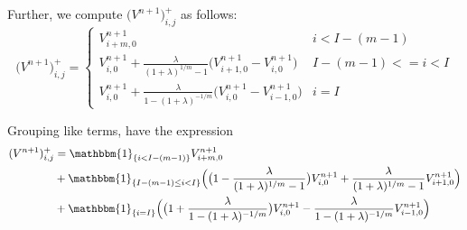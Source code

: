 \documentclass[12pt,english]{article}
\theoremstyle{remark}
\begin{document}
Further, we compute $\big(V^{n+1}\big)^+_{i,j}$ as follows: 
\[ \big(V^{n+1}\big)^+_{i,j} = \begin{cases} 
V^{n+1}_{i+m,0} & i < I - (m-1) \\
V^{n+1}_{i,0} + \frac{\lambda}{(1+\lambda)^{1/m} -1}\big( V^{n+1}_{i+1,0} - V^{n+1}_{i,0} \big) & I - (m-1) <= i < I \\
V^{n+1}_{i,0} + \frac{\lambda}{1-(1+\lambda)^{-1/m}}\big( V^{n+1}_{i,0} - V^{n+1}_{i-1,0} \big) & i = I 

\end{cases}
\]

Grouping like terms, have the expression 
\begin{align*}
(V^{n+1})^+_{i,j} &= \mathbbm{1}_{\{i<I-(m-1)\}} V_{i+m,0}^{n+1} \\
 				  &+ \mathbbm{1}_{\{I-(m-1) \le i < I\}} \Big(  \big(1-\frac{\lambda}{(1+\lambda)^{1/m} - 1}\big) V_{i,0}^{n+1} + \frac{\lambda}{(1+\lambda)^{1/m}-1} V_{i+1,0}^{n+1}  \Big) \\
 				  &+ \mathbbm{1}_{\{i=I\}} \Big( \big( 1 + \frac{\lambda}{1-(1+\lambda)^{-1/m}} \big) V_{i,0}^{n+1} - \frac{\lambda}{1-(1+\lambda)^{-1/m}} V_{i-1,0}^{n+1}  \Big)
\end{align*}
\end{document}

